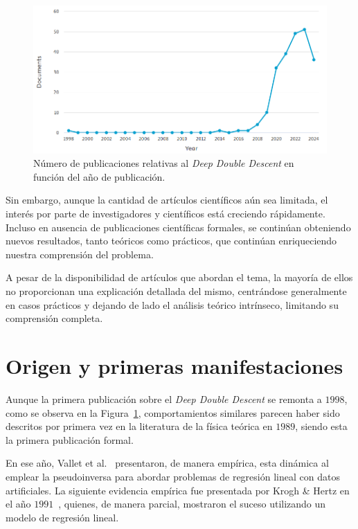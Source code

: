 \begin{figure}[h]
    \centering
    \includegraphics[width=0.8\linewidth]{img/scopus_histogram.png}
    \caption[Número de publicaciones relativas al \textit{Deep Double Descent} (ir actualizando histograma de cara a nuevos papers).] {Número de publicaciones relativas al \textit{Deep Double Descent} en función del año de publicación.}\label{fig:histogram}
\end{figure}

Sin embargo, aunque la cantidad de artículos científicos aún sea limitada, el interés por parte de investigadores y científicos está creciendo rápidamente. Incluso en ausencia de publicaciones científicas formales, se continúan obteniendo nuevos resultados, tanto teóricos como prácticos, que continúan enriqueciendo nuestra comprensión del problema.\newline

A pesar de la disponibilidad de artículos que abordan el tema, la mayoría de ellos no proporcionan una explicación detallada del mismo, centrándose generalmente en casos prácticos y dejando de lado el análisis teórico intrínseco, limitando su comprensión completa.\newline

\section{Origen y primeras manifestaciones}\label{}

Aunque la primera publicación sobre el \textit{Deep Double Descent} se remonta a $1998$, como se observa en la Figura~\ref{fig:histogram}, comportamientos similares parecen haber sido descritos por primera vez en la literatura de la física teórica en $1989$, siendo esta la primera publicación formal.\newline

En ese año, Vallet et al.~\cite{Vallet1989} presentaron, de manera empírica, esta dinámica al emplear la pseudoinversa para abordar problemas de regresión lineal con datos artificiales. La siguiente evidencia empírica fue presentada por Krogh \& Hertz en el año $1991$~\cite{Krogh1991}, quienes, de manera parcial, mostraron el suceso utilizando un modelo de regresión lineal.\newline

